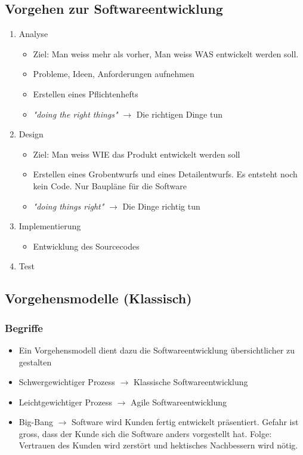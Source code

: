 \subsection{Vorgehen zur Softwareentwicklung}
	\begin{enumerate}
		\item Analyse
			\begin{itemize}
				\item Ziel: Man weiss mehr als vorher, Man weiss WAS entwickelt werden soll.
				\item Probleme, Ideen, Anforderungen aufnehmen
				\item Erstellen eines Pflichtenhefts
				\item \textit{"doing the right things"} $\rightarrow$ Die richtigen Dinge tun
			\end{itemize}
		\item Design
			\begin{itemize}
				\item Ziel: Man weiss WIE das Produkt entwickelt werden soll
				\item Erstellen eines Grobentwurfs und eines Detailentwurfs. Es entsteht noch kein Code. Nur Baupläne für die Software
				\item \textit{"doing things right"} $\rightarrow$ Die Dinge richtig tun
			\end{itemize}
		\item Implementierung
			\begin{itemize}
				\item Entwicklung des Sourcecodes 
			\end{itemize}
		\item Test 
	\end{enumerate}
\pagebreak

\subsection{Vorgehensmodelle (Klassisch)}
\subsubsection{Begriffe}
\begin{itemize}
	\item Ein Vorgehensmodell dient dazu die Softwareentwicklung übersichtlicher zu gestalten
	\item Schwergewichtiger Prozess $\rightarrow$ Klassische Softwareentwicklung
	\item Leichtgewichtiger Prozess $\rightarrow$ Agile Softwareentwicklung
	\item Big-Bang $\rightarrow$ Software wird Kunden fertig entwickelt präsentiert. Gefahr ist gross, dass der Kunde sich die Software anders vorgestellt hat. Folge: Vertrauen des Kunden wird zerstört und hektisches Nachbessern wird nötig. 
\end{itemize}


